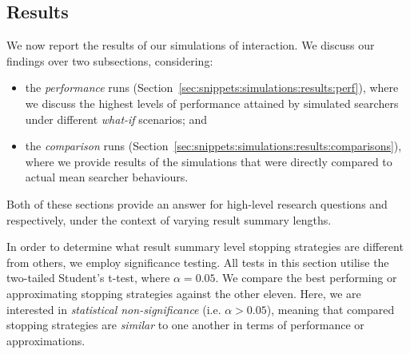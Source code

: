 \subsection{Results}\label{sec:snippets:simulations:results}
We now report the results of our simulations of interaction. We discuss our findings over two subsections, considering:

\begin{itemize}
    \item{the \emph{performance} runs (Section~\ref{sec:snippets:simulations:results:perf}), where we discuss the highest levels of performance attained by simulated searchers under different \emph{what-if} scenarios; and}
    \item{the \emph{comparison} runs (Section~\ref{sec:snippets:simulations:results:comparisons}), where we provide results of the simulations that were directly compared to actual mean searcher behaviours.}
\end{itemize}

Both of these sections provide an answer for high-level research questions  and  respectively, under the context of varying result summary lengths.

In order to determine what result summary level stopping strategies are different from others, we employ significance testing. All tests in this section utilise the two-tailed Student's t-test, where $\alpha=0.05$. We compare the best performing or approximating stopping strategies against the other eleven. Here, we are interested in \emph{statistical non-significance} (i.e. $\alpha > 0.05$), meaning that compared stopping strategies are \emph{similar} to one another in terms of performance or approximations.

